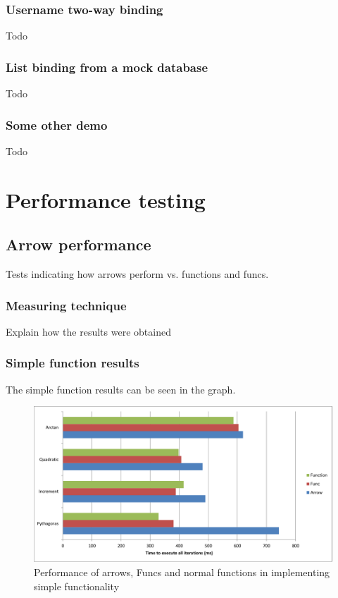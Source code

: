 \documentclass[12pt,twoside,notitlepage]{report}
\begin{document}
\subsubsection{Username two-way binding}

Todo

\subsubsection{List binding from a mock database}

Todo

\subsubsection{Some other demo}

Todo

\section{Performance testing}

\subsection{Arrow performance}

Tests indicating how arrows perform vs. functions and funcs.

\subsubsection{Measuring technique}

Explain how the results were obtained

\subsubsection{Simple function results}

The simple function results can be seen in the graph.

\begin{figure}[!ht]
  \centering
  \includegraphics[width=\textwidth]{fig/SimpleFunctionPerformanceChart.pdf}
  \caption{Performance of arrows, Funcs and normal functions in implementing simple functionality}
  \label{fig:simple_function_performance}
\end{figure}
\end{document}
